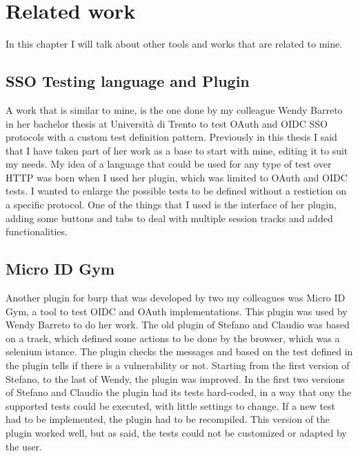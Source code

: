 \chapter{Related work}
In this chapter I will talk about other tools and works that are related to mine.

\section{SSO Testing language and Plugin}
A work that is similar to mine, is the one done by my colleague Wendy Barreto \cite{wendy_barreto} in her bachelor thesis at Università di Trento to test OAuth and OIDC SSO protocols with a custom test definition pattern. Previously in this thesis I said that I have taken part of her work as a base to start with mine, editing it to suit my needs. My idea of a language that could be used for any type of test over HTTP was born when I used her plugin, which was limited to OAuth and OIDC tests. I wanted to enlarge the possible tests to be defined without a restiction on a specific protocol. 
One of the things that I used is the interface of her plugin, adding some buttons and tabs to deal with multiple \gls{session track}s and added functionalities.

\section{Micro ID Gym}
Another plugin for burp that was developed by two my colleagues was Micro ID Gym, a tool to test OIDC and OAuth implementations. This plugin was used by Wendy Barreto to do her work.
The old plugin of Stefano and Claudio was based on a track, which defined some actions to be done by the browser, which was a selenium istance. The plugin checks the messages and based on the test defined in the plugin tells if there is a vulnerability or not.
Starting from the first version of Stefano, to the last of Wendy, the plugin was improved. In the first two versions of Stefano and Claudio the plugin had its tests hard-coded, in a way that ony the supported tests could be executed, with little settings to change. If a new test had to be implemented, the plugin had to be recompiled. This version of the plugin worked well, but as said, the tests could not be customized or adapted by the user.

